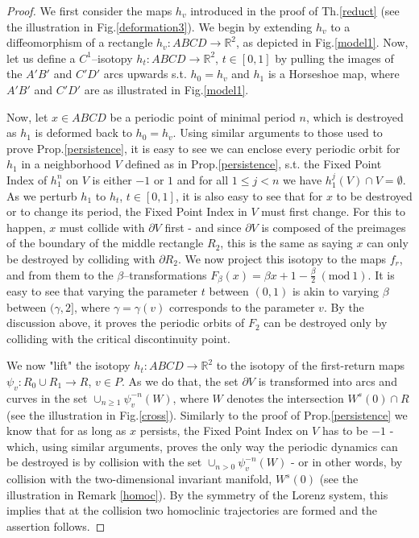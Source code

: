 \documentclass[10pt,reqno]{amsart}
\theoremstyle{plain}
\theoremstyle{assumption}
\theoremstyle{notation}
\theoremstyle{claim}
\theoremstyle{conj}
\theoremstyle{theorem}
\theoremstyle{proposition}
\theoremstyle{corollary}
\newcommand{\Mod}[1]{\ (\mathrm{mod}\ #1)}
\begin{document}
\begin{proof}
We first consider the maps $h_v$ introduced in the proof of Th.\ref{reduct} (see the illustration in Fig.\ref{deformation3}).  We begin by extending $h_v$ to a diffeomorphism of a rectangle $h_v:ABCD\to\mathbb{R}^2$, as depicted in Fig.\ref{model1}. Now, let us define a $C^1$--isotopy $h_t:ABCD\to\mathbb{R}^2$, $t\in[0,1]$ by pulling the images of the $A'B'$ and $C'D'$ arcs upwards s.t. $h_0=h_v$ and $h_1$ is a Horseshoe map, where $A'B'$ and $C'D'$ are as illustrated in Fig.\ref{model1}.

Now, let $x\in ABCD$ be a periodic point of minimal period $n$, which is destroyed as $h_1$ is deformed back to $h_0=h_v$. Using similar arguments to those used to prove Prop.\ref{persistence}, it is easy to see we can enclose every periodic orbit for $h_1$ in a neighborhood $V$ defined as in Prop.\ref{persistence}, s.t. the Fixed Point Index of $h^n_1$ on $V$ is either $-1$ or $1$ and for all $1\leq j<n$ we have $h^j_1(V)\cap V=\emptyset$. As we perturb $h_1$ to $h_t$, $t\in[0,1]$, it is also easy to see that for $x$ to be destroyed or to change its period, the Fixed Point Index in $V$ must first change. For this to happen, $x$ must collide with $\partial V$ first - and since $\partial V$ is composed of the preimages of the boundary of the middle rectangle $R_2$, this is the same as saying $x$ can only be destroyed by colliding with $\partial R_2$. We now project this isotopy to the maps $f_r$, and from them to the $\beta$--transformations $F_\beta(x)=\beta x+1-\frac{\beta}{2}\Mod{1}  $. It is easy to see that varying the parameter $t$ between $(0,1)$ is akin to varying $\beta$ between $(\gamma,2]$, where $\gamma=\gamma(v)$ corresponds to the parameter $v$. By the discussion above, it proves the periodic orbits of $F_2$ can be destroyed only by colliding with the critical discontinuity point.

We now "lift" the isotopy $h_t:ABCD\to\mathbb{R}^2$ to the isotopy of the first-return maps $\psi_v:{R_0}\cup {R_1}\to R$, $v\in P$. As we do that, the set $\partial V$ is transformed into arcs and curves in the set $\cup_{n\geq1}\psi^{-n}_v(W)$, where $W$ denotes the intersection $W^s(0)\cap R$ (see the illustration in Fig.\ref{cross}). Similarly to the proof of Prop.\ref{persistence} we know that for as long as $x$ persists, the Fixed Point Index on $V$ has to be $-1$ - which, using similar arguments, proves the only way the periodic dynamics can be destroyed is by collision with the set $\cup_{n>0}\psi_v^{-n}(W)$ - or in other words, by collision with the two-dimensional invariant manifold, $W^s(0)$ (see the illustration in Remark \ref{homoc}). By the symmetry of the Lorenz system, this implies that at the collision two homoclinic trajectories are formed and the assertion follows.
\end{proof}
\end{document}

